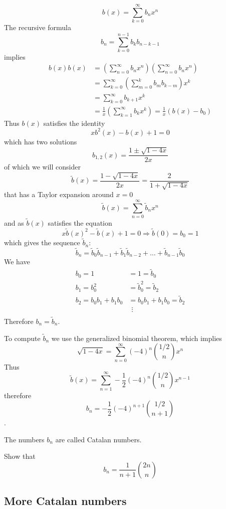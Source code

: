 $$
b(x)=\sum_{k=0}^{\infty} b_{n}x^{n}
$$
The recursive formula 
$$
b_{n}=\sum_{k=0}^{n-1} b_{k}b_{n-k-1}
$$
implies 
\begin{align*}
b(x)b(x) & =\left( \sum_{n=0}^{\infty} b_{n}x^{n} \right)\left( \sum_{n=0}^{\infty} b_{n}x^{n} \right) \\
 & =\sum_{k=0}^{\infty} \left( \sum_{m=0}^{k} b_{m}b_{k-m} \right)x^{k} \\
 & =\sum_{k=0}^{\infty} b_{k+1}x^{k}  \\
 & =\frac{1}{x}\left( \sum_{k=1}^{\infty} b_{k}x^{k} \right)=\frac{1}{x}(b(x)-b_{0})
\end{align*}
Thus $b(x)$ satisfies the identity
$$
xb^{2}(x)-b(x)+1=0
$$
which has two solutions
$$
b_{1,2}(x)= \frac{1\pm \sqrt{ 1-4x }}{2x}
$$
of which we will consider
$$
\tilde{b}(x)=\frac{1-\sqrt{ 1-4x }}{2x}=\frac{2}{1+\sqrt{ 1-4x }}
$$
that has a Taylor expansion around $x=0$
$$
\tilde{b}(x)=\sum_{n=0}^{\infty} \tilde{b}_{n}x^{n}
$$
and as $\tilde{b}(x)$ satisfies the equation 
$$
x\tilde{b}(x)^{2}-\tilde{b}(x)+1=0\Rightarrow \tilde{b}(0)=b_{0}=1
$$
which gives the sequence $\tilde{b}_{n}$:
$$
\tilde{b}_{n}=\tilde{b}_{0}\tilde{b}_{n-1}+\tilde{b}_{1}\tilde{b}_{n-2}+\dots +\tilde{b}_{n-1}\tilde{b}_{0}
$$
We have
\begin{align*}
b_{0}=1 &   =1 =\tilde{b}_{0} \\
b_{1}=b_{0}^{2}  & =\tilde{b}_{0}^{2}=\tilde{b}_{2} \\
b_{2}=b_{0}b_{1}+b_{1}b_{0} & =b_{0}b_{1}+b_{1}b_{0} =\tilde{b}_{2}  \\
 & ~~\vdots \\
\end{align*}
Therefore $b_{n}=\tilde{b}_{n}$.

To compute $\tilde{b}_{n}$ we use the generalized binomial theorem, which implies
$$
\sqrt{ 1-4x }=\sum_{n=0}^{\infty} (-4)^{n}\binom{ 1/2}  {n } x^{n}
$$
Thus
$$
\tilde{b}(x)=\sum_{n=1}^{\infty} -\frac{1}{2}(-4)^{n}\binom{ 1/2}  {n } x^{n-1} 
$$
therefore
$$
b_{n}=-\frac{1}{2}(-4)^{n+1}\binom{ 1/2}  {n+1 }
$$.

\begin{definition}
The numbers $b_{n}$ are called Catalan numbers.
\end{definition}
\begin{exercise}
Show that
$$
b_{n}=\frac{1}{n+1}\binom{ 2n}  {n }
$$
\end{exercise}

\subsection{More Catalan numbers}

